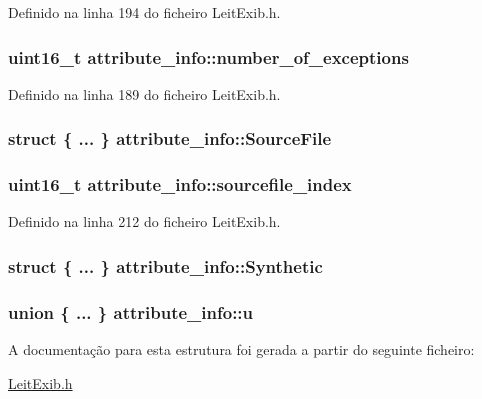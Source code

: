 Definido na linha 194 do ficheiro Leit\-Exib.\-h.

\hypertarget{structattribute__info_a7c0c2c58d833f7b63d0b6ab483e537f1}{
\subsubsection[{number\-\_\-of\-\_\-exceptions}]{\setlength{\rightskip}{0pt plus 5cm}uint16\-\_\-t attribute\-\_\-info\-::number\-\_\-of\-\_\-exceptions}}\label{structattribute__info_a7c0c2c58d833f7b63d0b6ab483e537f1}


Definido na linha 189 do ficheiro Leit\-Exib.\-h.

\hypertarget{structattribute__info_a19be8f9c59a8338514cb47f8a654335d}{
\subsubsection[{Source\-File}]{\setlength{\rightskip}{0pt plus 5cm}struct \{ ... \}   attribute\-\_\-info\-::\-Source\-File}}\label{structattribute__info_a19be8f9c59a8338514cb47f8a654335d}
\hypertarget{structattribute__info_a9e5e8288eaa9f8649a0380fe8ae3056f}{
\subsubsection[{sourcefile\-\_\-index}]{\setlength{\rightskip}{0pt plus 5cm}uint16\-\_\-t attribute\-\_\-info\-::sourcefile\-\_\-index}}\label{structattribute__info_a9e5e8288eaa9f8649a0380fe8ae3056f}


Definido na linha 212 do ficheiro Leit\-Exib.\-h.

\hypertarget{structattribute__info_a586a93df7c9a2b39e5b71d7b74817e78}{
\subsubsection[{Synthetic}]{\setlength{\rightskip}{0pt plus 5cm}struct \{ ... \}   attribute\-\_\-info\-::\-Synthetic}}\label{structattribute__info_a586a93df7c9a2b39e5b71d7b74817e78}
\hypertarget{structattribute__info_ad6c58ccdd200eb05a9e2c1d34b624530}{
\subsubsection[{u}]{\setlength{\rightskip}{0pt plus 5cm}union \{ ... \}   attribute\-\_\-info\-::u}}\label{structattribute__info_ad6c58ccdd200eb05a9e2c1d34b624530}


A documentação para esta estrutura foi gerada a partir do seguinte ficheiro\-:\begin{DoxyCompactItemize}
\item 
\hyperlink{_leit_exib_8h}{Leit\-Exib.\-h}\end{DoxyCompactItemize}
